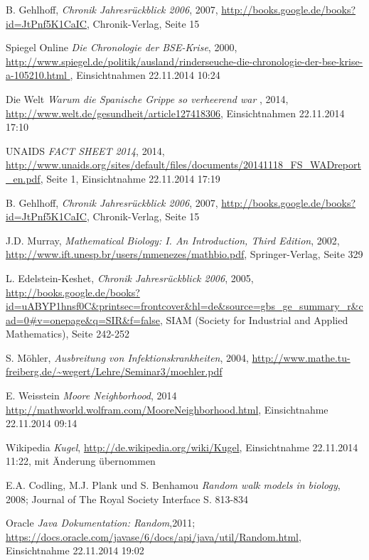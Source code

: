 \documentclass[10pt,twocolumn]{scrartcl}
\begin{document}
\begin{thebibliography}{99}
B. Gehlhoff,  \textit{Chronik Jahresrückblick 2006}, 2007,
\url{http://books.google.de/books?id=JtPnf5K1CaIC},
Chronik-Verlag, Seite 15


Spiegel Online {\it Die Chronologie der BSE-Krise}, 2000, \url{
	http://www.spiegel.de/politik/ausland/rinderseuche-die-chronologie-der-bse-krise-a-105210.html
}, Einsichtnahmen 22.11.2014 10:24


Die Welt {\it Warum die Spanische Grippe so verheerend war} , 2014, \url{http://www.welt.de/gesundheit/article127418306}, Einsichtnahmen 22.11.2014 17:10

	
UNAIDS {\it FACT SHEET 2014}, 2014,
	\url{http://www.unaids.org/sites/default/files/documents/20141118_FS_WADreport_en.pdf},
	Seite 1, Einsichtnahme 22.11.2014 17:19

	B. Gehlhoff,  \textit{Chronik Jahresrückblick 2006}, 2007,
	\url{http://books.google.de/books?id=JtPnf5K1CaIC},
	Chronik-Verlag, Seite 15



	J.D. Murray,  \textit{Mathematical Biology: I. An Introduction, Third Edition}, 2002,
	\url{http://www.ift.unesp.br/users/mmenezes/mathbio.pdf},
	Springer-Verlag, Seite 329	


	L. Edelstein-Keshet, \textit{Chronik Jahresrückblick 2006}, 2005,
	\url{http://books.google.de/books?id=uABYP1hnsf0C&printsec=frontcover&hl=de&source=gbs_ge_summary_r&cad=0#v=onepage&q=SIR&f=false},
	SIAM (Society for Industrial and Applied Mathematics), Seite 242-252
	

	S. Möhler,  \textit{Ausbreitung von Infektionskrankheiten}, 2004,
	\url{http://www.mathe.tu-freiberg.de/~wegert/Lehre/Seminar3/moehler.pdf}

	

E. Weisstein {\it Moore Neighborhood}, 2014 \url{http://mathworld.wolfram.com/MooreNeighborhood.html}, Einsichtnahme 22.11.2014 09:14


Wikipedia {\it Kugel}, \url{http://de.wikipedia.org/wiki/Kugel}, Einsichtnahme 22.11.2014 11:22, mit Änderung übernommen


E.A. Codling, M.J. Plank und S. Benhamou {\it Random walk models in biology}, 2008; Journal of The Royal Society Interface S. 813-834

Oracle  {\it Java Dokumentation: Random},2011; \url{https://docs.oracle.com/javase/6/docs/api/java/util/Random.html}, Einsichtnahme 22.11.2014 19:02
\end{thebibliography}
\end{document}
